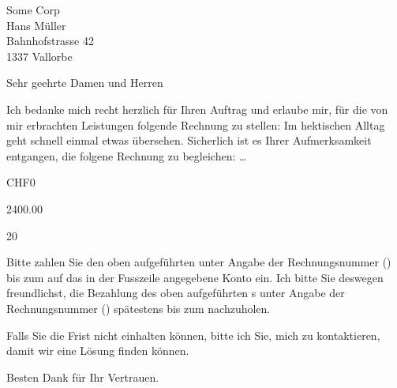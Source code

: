 \documentclass[DIN,SN,10pt,DIV=16,_rechnung]{scrlttr2}
\begin{document}
  \begin{letter}{
      Some Corp \\
      Hans Müller \\
      Bahnhofstrasse 42 \\
      1337 Vallorbe
    }

    \opening{Sehr geehrte Damen und Herren}
    \thispagestyle{plain}

    \ifnum{}
      Ich bedanke mich recht herzlich für Ihren Auftrag und erlaube mir, für die
      von mir erbrachten Leistungen folgende Rechnung zu stellen:
    \else
      \ifnum{}
        Im hektischen Alltag geht schnell einmal etwas übersehen.
        Sicherlich ist es Ihrer Aufmerksamkeit entgangen, die folgene Rechnung zu begleichen:
      \else
        \dots
      \fi
    \fi

    \renewcommand{\arraystretch}{1.2}

    \begin{invoice}{CHF}{0}

       {2400.00}
      \STExpenses


       {20}

    \end{invoice}

    \begin{samepage}
      \ifnum{}
        Bitte zahlen Sie den oben aufgeführten {\Total} unter Angabe der
        Rechnungsnummer () bis zum  auf
        das in der Fusszeile angegebene Konto ein.
      \else
        Ich bitte Sie deswegen freundlichst, die Bezahlung des oben aufgeführten
        {\Total}s unter Angabe der Rechnungsnummer () spätestens
        bis zum  nachzuholen.

        Falls Sie die Frist nicht einhalten können, bitte ich Sie, mich zu
        kontaktieren, damit wir eine Lösung finden können.
      \fi

      \closing{Besten Dank für Ihr Vertrauen.}

    \end{samepage}
 \end{letter}
\end{document}
